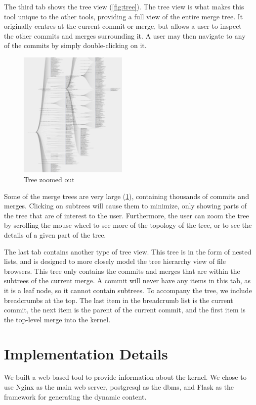 \documentclass[conference, draftclsnofoot]{IEEEtran}
\begin{document}
The third tab shows the tree view (\ref{fig:tree}). The tree view is what makes
this tool unique to the other tools, providing a full view of the entire merge
tree. It originally centres at the current commit or merge, but allows a
user to inspect the other commits and merges surrounding it. A user may then
navigate to any of the commits by simply double-clicking on it.

\begin{figure}[h]
        \centering
        \includegraphics[width=0.47\textwidth]{figures/tree_zoom.png}
        \caption{Tree zoomed out}
        \label{fig:zoomed_tree}
\end{figure}

Some of the merge trees are very large (\ref{fig:zoomed_tree}), containing
thousands of commits and merges. Clicking on subtrees will cause them to
minimize, only showing parts of the tree that are of interest to the user.
Furthermore, the user can zoom the tree by scrolling the mouse wheel to see
more of the topology of the tree, or to see the details of a given part of the
tree.

The last tab contains another type of tree view. This tree is in the form of
nested lists, and is designed to more closely model the tree hierarchy view of
file browsers. This tree only contains the commits and merges that are within
the subtrees of the current merge. A commit will never have any items in this
tab, as it is a leaf node, so it cannot contain subtrees. To accompany the
tree, we include breadcrumbs at the top. The last item in the breadcrumb list
is the current commit, the next item is the parent of the current commit, and
the first item is the top-level merge into the kernel.

\section{Implementation Details}
We built a web-based tool to provide information about the kernel.
We chose to use Nginx as the main web server, postgresql as the dbms, and Flask
as the framework for generating the dynamic content.
\end{document}
